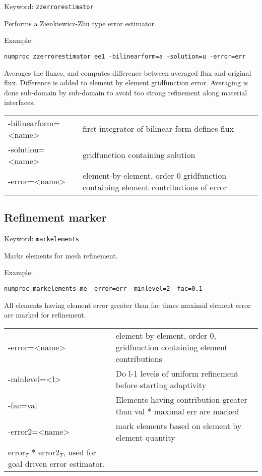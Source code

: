 \documentclass[12pt]{book}
\begin{document}
Keyword: {\tt zzerrorestimator}

Performs a Zienkiewicz-Zhu type error estimator.

Example:
\begin{verbatim}
numproc zzerrorestimator ee1 -bilinearform=a -solution=u -error=err
\end{verbatim}

Averages the fluxes, and computes difference between averaged flux and
original flux. Difference is added to element by element gridfunction
error. Averaging is done sub-domain by sub-domain to avoid too strong
refinement along material interfaces.

\begin{tabular}{ll}
\hline
-bilinearform=<name> & first integrator of bilinear-form defines flux \\
-solution=<name>   & gridfunction containing solution \\
-error=<name>      & element-by-element, order 0 gridfunction containing element contributions of error \\
\hline
\end{tabular}

\subsection{Refinement marker}

Keyword: {\tt markelements}

Marks elements for mesh refinement.

Example:
\begin{verbatim}
numproc markelements me -error=err -minlevel=2 -fac=0.1
\end{verbatim}

All elements having element error greater than fac times maximal element
error are marked for refinement. 

\begin{tabular}{ll}
\hline
-error=<name> & element by element, order 0, gridfunction containing element contributions \\
-minlevel=<l>  & Do l-1 levels of uniform refinement before starting adaptivity \\
-fac=val   & Elements having contribution greater than val * maximal err are marked \\
-error2=<name> & mark elements based on element by element quantity \\
error$_T$ * error2$_T$, used for goal driven error estimator. \\
\hline
\end{tabular}
\end{document}
